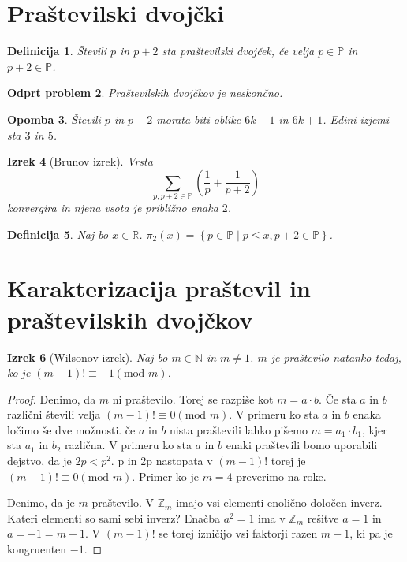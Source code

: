 \documentclass{amsart}
\newcommand{\RR}{\mathbb{R}}
\newcommand{\NN}{\mathbb{N}}
\newcommand{\PP}{\mathbb{P}}
\newcommand{\ZZ}{\mathbb{Z}}
\newtheorem{izrek}{Izrek}[section]
\newtheorem{definicija}[izrek]{Definicija}
\newtheorem{opomba}[izrek]{Opomba}
\newtheorem{odprt}[izrek]{Odprt problem}
\begin{document}
\newpage
\section{Praštevilski dvojčki}

\begin{definicija}
    Števili $p$ in $p+2$ sta \emph{praštevilski dvojček}, če velja $p \in \PP$ in $p+2 \in \PP$.
\end{definicija}

\begin{odprt}
    Praštevilskih dvojčkov je neskončno.
\end{odprt}

\begin{opomba}
    Števili $p$ in $p+2$ morata biti oblike $6k-1$ in $6k+1$. Edini izjemi sta $3$ in $5$.
\end{opomba}

\begin{izrek}[Brunov izrek]
    Vrsta \[\sum_{p, p+2 \in \PP} \left(\frac{1}{p} + \frac{1}{p+2}\right)\] konvergira in njena vsota je približno enaka $2$.
\end{izrek}

\begin{definicija}
    Naj bo $x \in \RR$. $\pi_2(x) = \left\{p \in \PP \mid p \leq x, p+2 \in \PP \right\}$. 
\end{definicija}

\newpage
\section{Karakterizacija praštevil in praštevilskih dvojčkov}

\begin{izrek}[Wilsonov izrek]
    Naj bo $m \in \NN$ in $m \neq 1$. $m$ je praštevilo natanko tedaj, ko je $\left(m-1\right)! \equiv -1 (\text{mod } m)$.
\end{izrek}

\begin{proof}
    Denimo, da $m$ ni praštevilo. Torej se razpiše kot $m = a\cdot b$. Če sta $a$ in $b$ različni števili velja $\left(m-1\right)! 
    \equiv 0 (\text{mod } m)$. V primeru ko sta $a$ in $b$ enaka ločimo še dve možnosti. če $a$ in $b$ nista praštevili lahko 
    pišemo $m = a_1\cdot b_1$, kjer sta $a_1$ in $b_2$ različna. V primeru ko sta $a$ in $b $ enaki praštevili bomo uporabili 
    dejstvo, da je $2p <p^2$. p in 2p nastopata v $\left(m-1\right)!$ torej je $\left(m-1\right)! \equiv 0 (\text{mod } m)$. 
    Primer ko je $m = 4$ preverimo na roke.

    Denimo, da je $m$ praštevilo. V $\ZZ_m$ imajo vsi elementi enolično določen inverz. Kateri elementi so sami sebi inverz?
    Enačba $a^2 = 1$ ima v $\ZZ_m$ rešitve $a = 1$ in $a = -1 = m-1$. V $\left(m-1\right)!$ se torej izničijo vsi faktorji 
    razen $m-1$, ki pa je kongruenten $-1$.
\end{proof}
\end{document}
